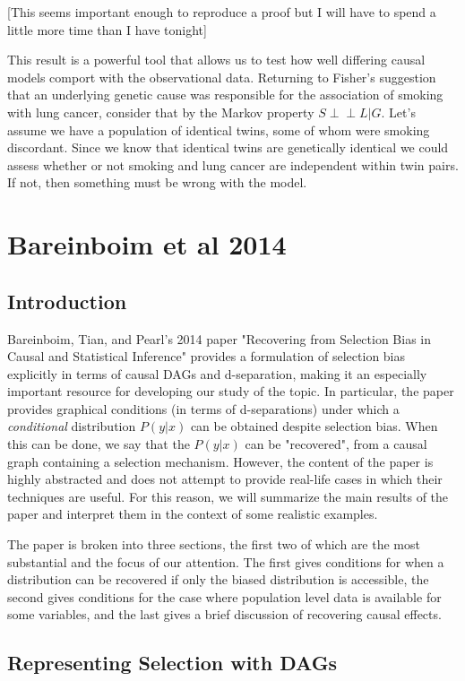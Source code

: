 \documentclass[12pt,twoside]{reedthesis}
\theoremstyle{definition}
\newcommand{\dsep}{\perp \!\!\!\perp}
\begin{document}
[This seems important enough to reproduce a proof but I will have to spend a little more time than I have tonight]

This result is a powerful tool that allows us to test how well differing causal models comport with the observational data.  Returning to Fisher's suggestion that an underlying genetic cause was responsible for the association of smoking with lung cancer, consider that by the Markov property $S \dsep L | G$. Let's assume we have a population of identical twins, some of whom were smoking discordant. Since we know that identical twins are genetically identical  we could assess whether or not smoking and lung cancer are independent within twin pairs. If not, then something must be wrong with the model. 
	

 \chapter{Bareinboim et al 2014}


\section{Introduction}
Bareinboim, Tian, and Pearl's 2014 paper "Recovering from Selection Bias in Causal and Statistical Inference" provides a formulation of selection bias explicitly in terms of causal DAGs and d-separation, making it an especially important resource for developing our study of the topic. In particular, the paper provides graphical conditions (in terms of d-separations) under which a \emph{conditional} distribution $P(y | x)$ can be obtained despite selection bias. When this can be done, we say that the $P(y | x)$ can be "recovered", from a causal graph containing a selection mechanism. However, the content of the paper is highly abstracted and does not attempt to provide real-life cases in which their techniques are useful. For this reason, we will summarize the main results of the paper and interpret them in the context of some realistic examples. 

The paper is broken into three sections, the first two of which are the most substantial and the focus of our attention. The first gives conditions for when a distribution can be recovered if only the biased distribution is accessible, the second gives conditions for the case where population level data is available for some variables, and the last gives a brief discussion of recovering causal effects.

\section{Representing Selection with DAGs}
\end{document}
